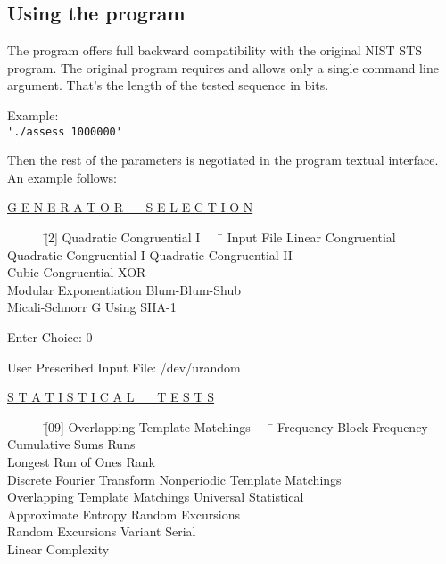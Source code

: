 \documentclass[12pt]{article}
\begin{document}
\subsection*{Using the program}
The program offers full backward compatibility with the original NIST STS program. The original program requires and allows only a single command line argument. That's the length of the tested sequence in bits.

\bigskip
Example:\\
\verb|'./assess 1000000'|

\smallskip
Then the rest of the parameters is negotiated in the program textual interface. An example follows:

\centerline{\underline{G E N E R A T O R \ \ \ S E L E C T I O N}}

\begin{tabbing}
\ \ \ \ \ \ \= [2] Quadratic Congruential I \ \ \ \= \kill
    \>[0] Input File                 \>[1] Linear Congruential\\
    \>[2] Quadratic Congruential I   \>[3] Quadratic Congruential II\\
    \>[4] Cubic Congruential         \>[5] XOR\\
    \>[6] Modular Exponentiation     \>[7] Blum-Blum-Shub\\
    \>[8] Micali-Schnorr             \>[9] G Using SHA-1
\end{tabbing}

\bigskip
Enter Choice: 0

\centerline{User Prescribed Input File: /dev/urandom}

\bigskip
\centerline{\underline{S T A T I S T I C A L \ \ \ T E S T S}}

\begin{tabbing}
\ \ \ \ \ \ \= [09] Overlapping Template Matchings \ \ \ \= \kill
    \>[01] Frequency                       \>[02] Block Frequency\\
    \>[03] Cumulative Sums                 \>[04] Runs\\
    \>[05] Longest Run of Ones             \>[06] Rank\\
    \>[07] Discrete Fourier Transform      \>[08] Nonperiodic Template Matchings\\
    \>[09] Overlapping Template Matchings  \>[10] Universal Statistical\\
    \>[11] Approximate Entropy             \>[12] Random Excursions\\
    \>[13] Random Excursions Variant       \>[14] Serial\\
    \>[15] Linear Complexity \>
\end{tabbing}
\end{document}
